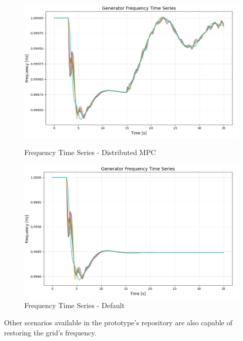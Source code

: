 \documentclass{article}
\begin{document}
\begin{figure}[ht]
    \centering
    \begin{minipage}{0.45\textwidth}
        \centering
        \includegraphics[width=\textwidth]{figures/mpc_load.png}
        \caption{Frequency Time Series - Distributed MPC}
        \label{fig:frequency_response_1}
    \end{minipage}%
    \hspace{0.1cm}  %
    \begin{minipage}{0.45\textwidth}
        \centering
        \includegraphics[width=\textwidth]{figures/non_mpc_load.png}
        \caption{Frequency Time Series - Default}
        \label{fig:frequency_response_2}
    \end{minipage}
\end{figure}

Other scenarios available in the prototype's repository are also capable of restoring the grid's frequency. 
\end{document}
